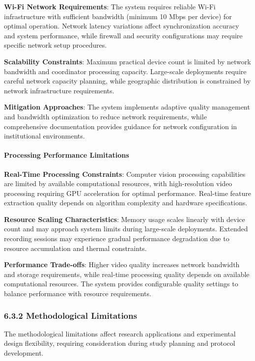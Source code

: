 \documentclass[11pt,a4paper]{article}
\begin{document}
\textbf{Wi-Fi Network Requirements}: The system requires reliable Wi-Fi infrastructure with sufficient bandwidth (minimum 10
Mbps per device) for optimal operation. Network latency variations affect synchronization accuracy and system
performance, while firewall and security configurations may require specific network setup procedures.

\textbf{Scalability Constraints}: Maximum practical device count is limited by network bandwidth and coordinator processing
capacity. Large-scale deployments require careful network capacity planning, while geographic distribution is
constrained by network infrastructure requirements.

\textbf{Mitigation Approaches}: The system implements adaptive quality management and bandwidth optimization to reduce
network requirements, while comprehensive documentation provides guidance for network configuration in institutional
environments.

\paragraph{Processing Performance Limitations}

\textbf{Real-Time Processing Constraints}: Computer vision processing capabilities are limited by available computational
resources, with high-resolution video processing requiring GPU acceleration for optimal performance. Real-time feature
extraction quality depends on algorithm complexity and hardware specifications.

\textbf{Resource Scaling Characteristics}: Memory usage scales linearly with device count and may approach system limits
during large-scale deployments. Extended recording sessions may experience gradual performance degradation due to
resource accumulation and thermal constraints.

\textbf{Performance Trade-offs}: Higher video quality increases network bandwidth and storage requirements, while real-time
processing quality depends on available computational resources. The system provides configurable quality settings to
balance performance with resource requirements.

\subsubsection{6.3.2 Methodological Limitations}

The methodological limitations affect research applications and experimental design flexibility, requiring consideration
during study planning and protocol development.
\end{document}
